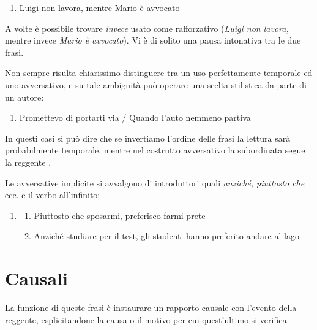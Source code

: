 \documentclass[
  a4paper,
  twoside,
  11pt,
  chapterprefix=false,
  bibliography=totocnumbered,
  listof=flat]{scrbook}
\providecommand{\tightlist}{%
  \setlength{\itemsep}{0pt}\setlength{\parskip}{0pt}}
\begin{document}
\begin{enumerate}
\def\labelenumi{(\arabic{enumi})}
\setcounter{enumi}{69}
\tightlist
\item
  Luigi non lavora, mentre Mario è avvocato
\end{enumerate}

A volte è possibile trovare \emph{invece} usato come rafforzativo (\emph{Luigi non lavora,} mentre invece \emph{Mario è avvocato}). Vi è di solito una pausa intonativa tra le due frasi.

Non sempre risulta chiarissimo distinguere tra un uso perfettamente temporale ed uno avversativo, e su tale ambiguità può operare una scelta stilistica da parte di un autore:

\begin{enumerate}
\def\labelenumi{(\arabic{enumi})}
\setcounter{enumi}{70}
\tightlist
\item
  Promettevo di portarti via / Quando l'auto nemmeno partiva \citep{fibra2017}
\end{enumerate}

In questi casi si può dire che se invertiamo l'ordine delle frasi la lettura sarà probabilmente temporale, mentre nel costrutto avversativo la subordinata segue la reggente \citep[95]{bianco2017}.

Le avversative implicite si avvalgono di introduttori quali \emph{anziché, piuttosto che} ecc. e il verbo all'infinito:

\begin{enumerate}
\def\labelenumi{(\arabic{enumi})}
\setcounter{enumi}{71}
\item
  \begin{enumerate}
  \def\labelenumii{\alph{enumii}.}
  \tightlist
  \item
    Piuttosto che sposarmi, preferisco farmi prete
  \item
    Anziché studiare per il test, gli studenti hanno preferito andare al lago
  \end{enumerate}
\end{enumerate}

\hypertarget{causali}{%
\section{Causali}\label{causali}}

La funzione di queste frasi è instaurare un rapporto causale con l'evento della reggente, esplicitandone la causa o il motivo per cui quest'ultimo si verifica.
\end{document}

